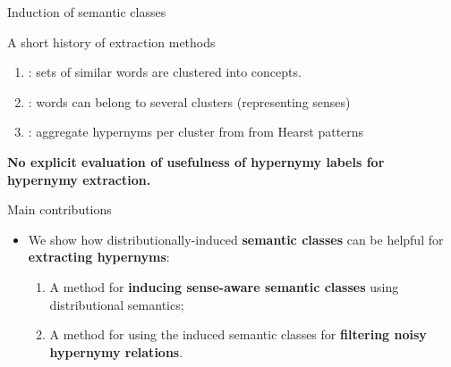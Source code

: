 \documentclass[usenames,dvipsnames]{beamer}
\begin{document}
\begin{frame}{Induction of semantic classes}

\begin{block}{A short history of extraction methods}

\begin{enumerate}
	\item  \cite{Lin2001}: sets of similar words are clustered into concepts.
	\item \cite{Pantel2002}: words can belong to several clusters (representing senses)
	\item \cite{Pantel2004}: aggregate hypernyms per cluster from from Hearst patterns
 

\end{enumerate}
\end{block}

\textbf{No explicit evaluation of \alert{usefulness} of hypernymy labels for \alert{hypernymy extraction}.}

\end{frame}

\begin{frame}{Main contributions}


\begin{itemize}
	\item We show how distributionally-induced \alert{\textbf{semantic classes}} can be helpful  for \alert{\textbf{extracting hypernyms}}:
	\pause
	\vspace{10pt}
	\begin{enumerate}
		\item A method for \textbf{\alert{inducing sense-aware semantic classes}} using distributional semantics; 
		\vspace{10pt}
		\item A method for using the induced semantic classes for \textbf{\alert{filtering noisy hypernymy relations}}.
	 \end{enumerate}
\end{itemize}
\end{frame}
\end{document}
